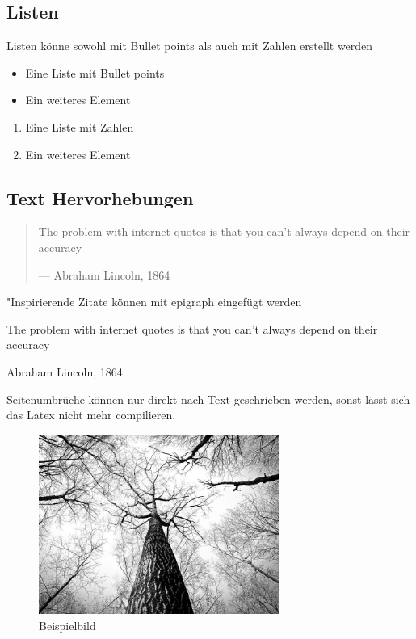 \subsection{Listen}
Listen könne sowohl mit Bullet points als auch mit Zahlen erstellt werden
\begin{itemize}
	\item Eine Liste mit Bullet points
	\item Ein weiteres Element
\end{itemize}

\begin{enumerate}
	\item Eine Liste mit Zahlen
	\item Ein weiteres Element
\end{enumerate}

\subsection{Text Hervorhebungen}
\begin{quote}
	The problem with internet quotes is that you can't always depend on their accuracy \par\raggedleft--- \textup{Abraham Lincoln, 1864}
\end{quote}

"Inspirierende Zitate können mit epigraph eingefügt werden
\epigraph{The problem with internet quotes is that you can't always depend on their accuracy}{Abraham Lincoln, 1864}

Seitenumbrüche können nur direkt nach Text geschrieben werden, sonst lässt sich das Latex nicht mehr compilieren.
\\

\begin{figure}[H]
	\centering
	\includegraphics[width=0.7\textwidth]{resources/example}
	\caption{Beispielbild {\cite{PEXELS2015}}}
	\label{img:beispielbild}
\end{figure}

